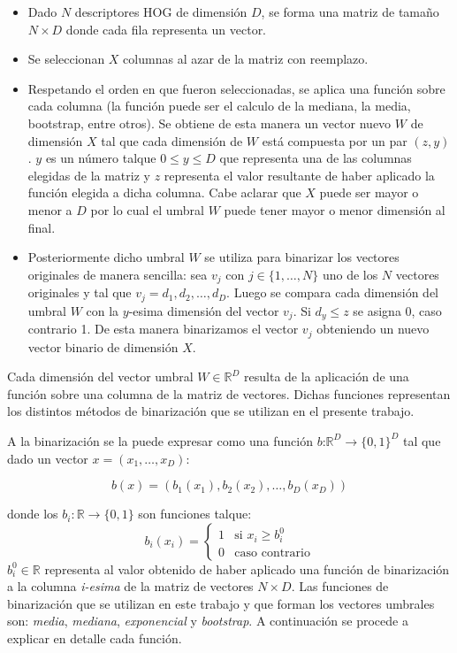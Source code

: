 		\begin{itemize}
		
			\item Dado $N$ descriptores HOG de dimensión $D$, se forma una matriz de tamaño $N \times D$ donde cada fila representa un vector.
			\item Se seleccionan $X$ columnas al azar de la matriz con reemplazo.
			\item Respetando el orden en que fueron seleccionadas, se aplica una función sobre cada columna (la función puede ser el calculo de la mediana, la media, bootstrap, entre otros). Se obtiene de esta manera un vector nuevo $W$ de dimensión $X$ tal que cada dimensión de $W$ está compuesta por un par $(z,y)$. $y$ es un número talque $0 \leq y \leq D$ que representa una de las columnas elegidas de la matriz y $z$ representa el valor resultante de haber aplicado la función elegida a dicha columna. Cabe aclarar que $X$ puede ser mayor o menor a $D$ por lo cual el umbral $W$ puede tener mayor o menor dimensión al final.
			\item Posteriormente dicho umbral $W$ se utiliza para binarizar los vectores originales de manera sencilla: sea $v_j$ con $j \in \{1,\dots,N\}$ uno de los $N$ vectores originales y tal que $v_j = d_1,d_2,\dots,d_D$. Luego se compara cada dimensión del umbral $W$ con la $y$-esima dimensión del vector $v_j$. Si $d_y \leq z$ se asigna 0, caso contrario 1. De esta manera binarizamos el vector $v_j$ obteniendo un nuevo vector binario de dimensión $X$.
			
		\end{itemize}

	Cada dimensión del vector umbral $W \in \mathbb{R}^{D}$ resulta de la aplicación de una función sobre una columna de la matriz de vectores. Dichas funciones representan los distintos métodos de binarización que se utilizan en el presente trabajo.
	
	A la binarización se la puede expresar como una función $\textit{b:}\mathbb{R}^{D} \rightarrow \{ 0, 1\}^{D} $ tal que dado un vector $x=(x_1, \dots, x_D)$:
	
	$$ b(x) = (b_{1}(x_1), b_{2}(x_2), \dots, b_{D}(x_D)) $$
	
	donde los $b_i: \mathbb{R} \rightarrow \{0, 1\}$ son funciones talque:
	\[
    		b_{i}(x_i) = 
		\begin{cases}
    			1 & \text{si } x_i \geq b_{i}^{0}\\
    			0 & \text{caso contrario}
		\end{cases}
	\]
	$b_{i}^{0} \in \mathbb{R}$ representa al valor obtenido de haber aplicado una función de binarización a la columna \textit{i-esima} de la matriz de vectores $N \times D$. Las funciones de binarización que se utilizan en este trabajo y que forman los vectores umbrales son: \textit{media}, \textit{mediana}, \textit{exponencial} y \textit{bootstrap}. A continuación se procede a explicar en detalle cada función.
	
